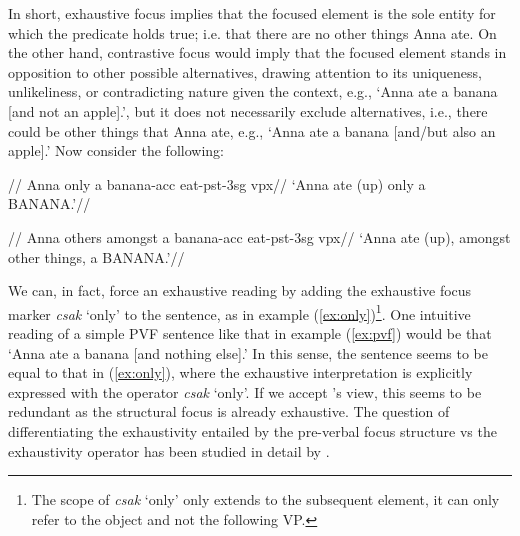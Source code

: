 \documentclass[ruler]{CUP-JNL-LIN}%
\begin{document}


In short, exhaustive focus implies that the focused element is the sole entity for which the predicate holds true; i.e. that there are no other things Anna ate. On the other hand, contrastive focus would imply that the focused element stands in opposition to other possible alternatives, drawing attention to its uniqueness, unlikeliness, or contradicting nature given the context, e.g., `Anna ate a banana [and not an apple].', but it does not necessarily exclude alternatives, i.e., there could be other things that Anna ate, e.g., `Anna ate a banana [and/but also an apple].' Now consider the following:



\pex[everygla={},aboveglftskip=0em,interpartskip=0pt]
\begingl \label{ex:only}
//
\glb Anna{\sc [nom]} only a banana-{\sc acc} eat-{\sc pst-3sg} {\sc vpx}//
\glft `Anna ate (up) only a BANANA.'//
\endgl
\xe

\vspace{-12px}

\pex[everygla={},aboveglftskip=0em,interpartskip=0pt]
\begingl \label{ex:amongst_others}
//
\glb Anna{\sc [nom]} {others amongst} a banana-{\sc acc} eat-{\sc pst-3sg} {\sc vpx}//
\glft `Anna ate (up), amongst other things, a BANANA.'//
\endgl
\xe



We can, in fact, force an exhaustive reading by adding the exhaustive focus marker \textit{csak} `only' to the sentence, as in example (\ref{ex:only})\footnote{The scope of \textit{csak} `only' only extends to the subsequent element, it can only refer to the object and not the following VP.}. One intuitive reading of a simple PVF sentence like that in example (\ref{ex:pvf}) would be that `Anna ate a banana [and nothing else].' In this sense, the sentence seems to be equal to that in (\ref{ex:only}), where the exhaustive interpretation is explicitly expressed with the operator \textit{csak} `only'. If we accept \citet{ekiss_1998_identificational}'s view, this seems to be redundant as the structural focus is already exhaustive. The question of differentiating the exhaustivity entailed by the pre-verbal focus structure vs the exhaustivity operator has been studied in detail by \citet{balogh_2007_focus}. 
\end{document}

